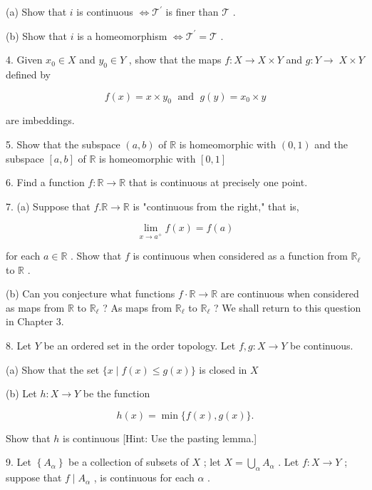 \documentclass[10pt]{article}
\begin{document}
(a) Show that \(i\) is continuous \(\Leftrightarrow  {\mathcal{T}}^{\prime }\) is finer than \(\mathcal{T}\) .

(b) Show that \(i\) is a homeomorphism \(\Leftrightarrow  {\mathcal{T}}^{\prime } = \mathcal{T}\) .

4. Given \({x}_{0} \in  X\) and \({y}_{0} \in  Y\) , show that the maps \(f : X \rightarrow  X \times  Y\) and \(g : Y \rightarrow \; X \times  Y\) defined by

\[
f\left( x\right)  = x \times  {y}_{0}\;\text{ and }\;g\left( y\right)  = {x}_{0} \times  y
\]

are imbeddings.

5. Show that the subspace \(\left( {a,b}\right)\) of \(\mathbb{R}\) is homeomorphic with \(\left( {0,1}\right)\) and the subspace \(\left\lbrack  {a,b}\right\rbrack\) of \(\mathbb{R}\) is homeomorphic with \(\left\lbrack  {0,1}\right\rbrack\)

6. Find a function \(f : \mathbb{R} \rightarrow  \mathbb{R}\) that is continuous at precisely one point.

7. (a) Suppose that \(f.\mathbb{R} \rightarrow  \mathbb{R}\) is "continuous from the right," that is,

\[
\mathop{\lim }\limits_{{x \rightarrow  {a}^{ + }}}f\left( x\right)  = f\left( a\right)
\]

for each \(a \in  \mathbb{R}\) . Show that \(f\) is continuous when considered as a function from \({\mathbb{R}}_{\ell }\) to \(\mathbb{R}\) .

(b) Can you conjecture what functions \(f \cdot  \mathbb{R} \rightarrow  \mathbb{R}\) are continuous when considered as maps from \(\mathbb{R}\) to \({\mathbb{R}}_{\ell }\) ? As maps from \({\mathbb{R}}_{\ell }\) to \({\mathbb{R}}_{\ell }\) ? We shall return to this question in Chapter 3.

8. Let \(Y\) be an ordered set in the order topology. Let \(f,g : X \rightarrow  Y\) be continuous.

(a) Show that the set \(\{ x \mid  f\left( x\right)  \leq  g\left( x\right) \}\) is closed in \(X\)

(b) Let \(h : X \rightarrow  Y\) be the function

\[
h\left( x\right)  = \min \{ f\left( x\right) ,g\left( x\right) \} .
\]

Show that \(h\) is continuous [Hint: Use the pasting lemma.]

9. Let \(\left\{  {A}_{\alpha }\right\}\) be a collection of subsets of \(X\) ; let \(X = \mathop{\bigcup }\limits_{\alpha }{A}_{\alpha }\) . Let \(f : X \rightarrow  Y\) ; suppose that \(f \mid  {A}_{\alpha }\) , is continuous for each \(\alpha\) .
\end{document}
